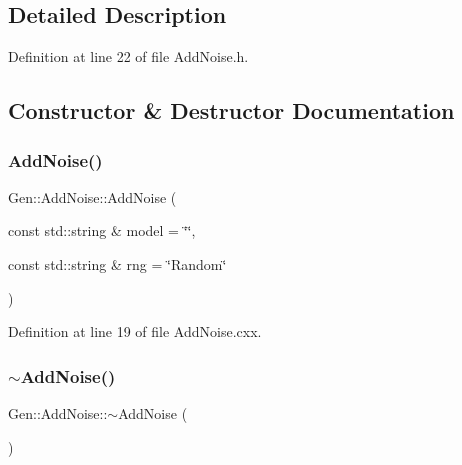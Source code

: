 \subsection{Detailed Description}


Definition at line 22 of file Add\+Noise.\+h.



\subsection{Constructor \& Destructor Documentation}
\mbox{\label{class_wire_cell_1_1_gen_1_1_add_noise_a0db23621b39f1263e776a033e961bd78}} 
\subsubsection{\texorpdfstring{Add\+Noise()}{AddNoise()}}
{\footnotesize\ttfamily Gen\+::\+Add\+Noise\+::\+Add\+Noise (\begin{DoxyParamCaption}\item[{const std\+::string \&}]{model = {\ttfamily \char`\"{}\char`\"{}},  }\item[{const std\+::string \&}]{rng = {\ttfamily \char`\"{}Random\char`\"{}} }\end{DoxyParamCaption})}



Definition at line 19 of file Add\+Noise.\+cxx.

\mbox{\label{class_wire_cell_1_1_gen_1_1_add_noise_abff519ffe2d1d09d7e3e7bc1f50165d4}} 
\subsubsection{\texorpdfstring{$\sim$\+Add\+Noise()}{~AddNoise()}}
{\footnotesize\ttfamily Gen\+::\+Add\+Noise\+::$\sim$\+Add\+Noise (\begin{DoxyParamCaption}{ }\end{DoxyParamCaption})\hspace{0.3cm}{\ttfamily [virtual]}}



